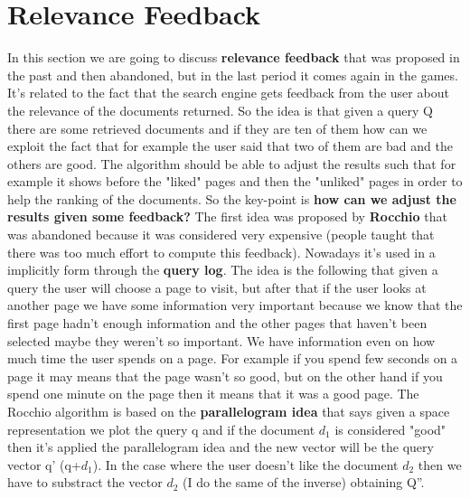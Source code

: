 \section{Relevance Feedback}
In this section we are going to discuss \textbf{relevance feedback} that was proposed in the past and then abandoned, but in the last period it comes again in the games.\newline
It's related to the fact that the search engine gets feedback from the user about the relevance of the documents returned.\newline
So the idea is that given a query Q there are some retrieved documents and if they are ten of them how can we exploit the fact that for example the user said that two of them are bad and the others are good. The algorithm should be able to adjust the results such that for example it shows before the "liked" pages and then the "unliked" pages in order to help the ranking of the documents.\newline
So the key-point is \textbf{how can we adjust the results given some feedback?} The first idea was proposed by \textbf{Rocchio} that was abandoned because it was considered very expensive (people taught that there was too much effort to compute this feedback).\newline
Nowadays it's used in a implicitly form through the \textbf{query log}. The idea is the following that given a query the user will choose a page to visit, but after that if the user looks at another page we have some information very important because we know that the first page hadn't enough information and the other pages that haven't been selected maybe they weren't so important. We have information even on how much time the user spends on a page. For example if you spend few seconds on a page it may means that the page wasn't so good, but on the other hand if you spend one minute on the page then it means that it was a good page.\newline
The Rocchio algorithm is based on the \textbf{parallelogram idea} that says given a space representation we plot the query q and if the document $d_1$ is considered "good" then it's applied the parallelogram idea and the new vector will be the query vector q' (q+$d_1$). In the case where the user doesn't like the document $d_2$ then we have to substract the vector $d_2$ (I do the same of the inverse) obtaining Q''.\newline
